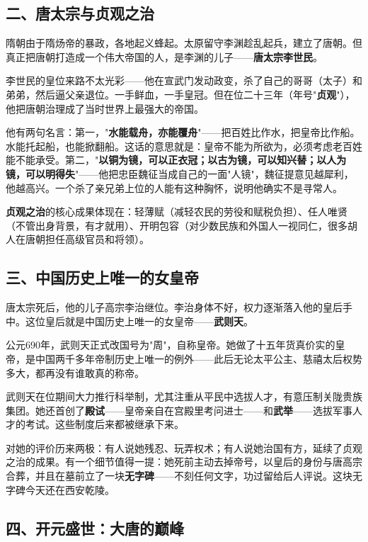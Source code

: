 \documentclass[a4paper,12pt]{ctexart}
\begin{document}
\subsection*{二、唐太宗与贞观之治}

隋朝由于隋炀帝的暴政，各地起义蜂起。太原留守李渊趁乱起兵，建立了唐朝。但真正把唐朝打造成一个伟大帝国的人，是李渊的儿子——\textbf{唐太宗李世民}。

李世民的皇位来路不太光彩——他在宣武门发动政变，杀了自己的哥哥（太子）和弟弟，然后逼父亲退位。一手鲜血，一手皇冠。但在位二十三年（年号"\textbf{贞观}"），他把唐朝治理成了当时世界上最强大的帝国。

他有两句名言：第一，"\textbf{水能载舟，亦能覆舟}"——把百姓比作水，把皇帝比作船。水能托起船，也能掀翻船。这话的意思就是：皇帝不能为所欲为，必须考虑老百姓能不能承受。第二，"\textbf{以铜为镜，可以正衣冠；以古为镜，可以知兴替；以人为镜，可以明得失}"——他把忠臣魏征当成自己的一面"人镜"，魏征提意见越犀利，他越高兴。一个杀了亲兄弟上位的人能有这种胸怀，说明他确实不是寻常人。

\textbf{贞观之治}的核心成果体现在：轻薄赋（减轻农民的劳役和赋税负担）、任人唯贤（不管出身背景，有才就用）、开明包容（对少数民族和外国人一视同仁，很多胡人在唐朝担任高级官员和将领）。

\subsection*{三、中国历史上唯一的女皇帝}

唐太宗死后，他的儿子高宗李治继位。李治身体不好，权力逐渐落入他的皇后手中。这位皇后就是中国历史上唯一的女皇帝——\textbf{武则天}。

公元690年，武则天正式改国号为"周"，自称皇帝。她做了十五年货真价实的皇帝，是中国两千多年帝制历史上唯一的例外——此后无论太平公主、慈禧太后权势多大，都再没有谁敢真的称帝。

武则天在位期间大力推行科举制，尤其注重从平民中选拔人才，有意压制关陇贵族集团。她还首创了\textbf{殿试}——皇帝亲自在宫殿里考问进士——和\textbf{武举}——选拔军事人才的考试。这些制度后来都被继承下来。

对她的评价历来两极：有人说她残忍、玩弄权术；有人说她治国有方，延续了贞观之治的成果。有一个细节值得一提：她死前主动去掉帝号，以皇后的身份与唐高宗合葬，并且在墓前立了一块\textbf{无字碑}——不刻任何文字，功过留给后人评说。这块无字碑今天还在西安乾陵。

\subsection*{四、开元盛世：大唐的巅峰}
\end{document}
